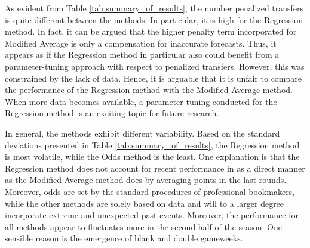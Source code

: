 \newpar

As evident from Table \ref{tab:summary_of_results}, the number penalized transfers is quite different between the methods. In particular, it is high for the Regression method. In fact, it can be argued that the higher penalty term incorporated for Modified Average is only a compensation for inaccurate forecasts. Thus, it appears as if the Regression method in particular also could benefit from a parameter-tuning approach with respect to penalized transfers. However, this was constrained by the lack of data. Hence, it is arguable that it is unfair to compare the performance of the Regression method with the Modified Average method. When more data becomes available, a parameter tuning conducted for the Regression method is an exciting topic for future research.

\newpar 

In general, the methods exhibit different variability. Based on the standard deviations presented in Table \ref{tab:summary_of_results}, the Regression method is most volatile, while the Odds method is the least. One explanation is that the Regression method does not account for recent performance in as a direct manner as the Modified Average method does by averaging points in the last rounds. Moreover, odds are set by the standard procedures of professional bookmakers, while the other methods are solely based on data and will to a larger degree incorporate extreme and unexpected past events. Moreover, the performance for all methods appear to fluctuates more in the second half of the season. One sensible reason is the emergence of blank and double gameweeks. 

\newpar

